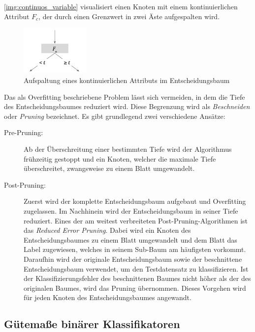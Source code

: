 \autoref{img:continuos_variable} visualisiert einen Knoten mit einem kontinuierlichen Attribut $F_c$, der durch einen Grenzwert in zwei Äste aufgespalten wird.


\begin{figure}[h]
	\centering
	\includegraphics[width=0.3\textwidth]{bilder/continuos_variable.png}
	\caption{Aufspaltung eines kontinuierlichen Attributs im Entscheidungsbaum}
	\label{img:continuos_variable}
\end{figure}


Das als Overfitting beschriebene Problem lässt sich vermeiden, in dem die Tiefe des Entscheidungsbaumes reduziert wird. Diese Begrenzung wird als \emph{Beschneiden} oder \emph{Pruning} bezeichnet. Es gibt grundlegend zwei verschiedene Ansätze:

\begin{description}
 \item[Pre-Pruning:] Ab der Überschreitung einer bestimmten Tiefe wird der Algorithmus frühzeitig gestoppt und ein Knoten, welcher die maximale Tiefe überschreitet, zwangsweise zu einem Blatt umgewandelt. 
 \item[Post-Pruning:] Zuerst wird der komplette Entscheidungsbaum aufgebaut und Overfitting zugelassen. Im Nachhinein wird der Entscheidungsbaum in seiner Tiefe reduziert. Eines der am weitest verbreiteten Post-Pruning-Algorithmen ist das \emph{Reduced Error Pruning}. Dabei wird ein Knoten des Entscheidungsbaumes zu einem Blatt umgewandelt und dem Blatt das Label zugewiesen, welches in seinem Sub-Baum am häufigsten vorkommt. Daraufhin wird der originale Entscheidungsbaum sowie der beschnittene Entscheidungsbaum verwendet, um den Testdatensatz zu klassifizieren. Ist der Klassifizierungsfehler des beschnittenen Baumes nicht höher als der des originalen Baumes, wird das Pruning übernommen. Dieses Vorgehen wird für jeden Knoten des Entscheidungsbaumes angewandt. \cite[S. 68 - 70]{machine_mitchell} 
\end{description}


\subsection{Gütemaße binärer Klassifikatoren}
\label{sec:howGoodIsMyClassifier}

